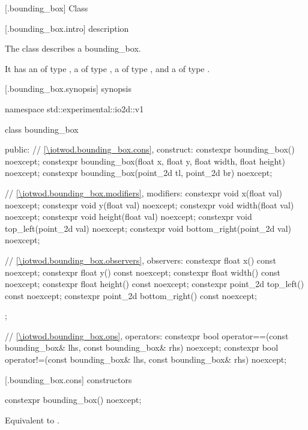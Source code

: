  [\iotwod.bounding_box] {Class }

 [\iotwod.bounding_box.intro] { description}

%
\pnum
The class  describes a bounding_box.

\pnum
It has an  of type , a  of type , a  of type , and a  of type .

 [\iotwod.bounding_box.synopsis] { synopsis}

\begin{codeblock}
namespace std::experimental::io2d::v1 {
  class bounding_box {
  public:
    // \ref{\iotwod.bounding_box.cons}, construct:
    constexpr bounding_box() noexcept;
    constexpr bounding_box(float x, float y, float width, float height)
      noexcept;
    constexpr bounding_box(point_2d tl, point_2d br) noexcept;

    // \ref{\iotwod.bounding_box.modifiers}, modifiers:
    constexpr void x(float val) noexcept;
    constexpr void y(float val) noexcept;
    constexpr void width(float val) noexcept;
    constexpr void height(float val) noexcept;
    constexpr void top_left(point_2d val) noexcept;
    constexpr void bottom_right(point_2d val) noexcept;
    
    // \ref{\iotwod.bounding_box.observers}, observers:
    constexpr float x() const noexcept;
    constexpr float y() const noexcept;
    constexpr float width() const noexcept;
    constexpr float height() const noexcept;
    constexpr point_2d top_left() const noexcept;
    constexpr point_2d bottom_right() const noexcept;
  };
  
  // \ref{\iotwod.bounding_box.ops}, operators:
  constexpr bool operator==(const bounding_box& lhs, const bounding_box& rhs) 
    noexcept;
  constexpr bool operator!=(const bounding_box& lhs, const bounding_box& rhs) 
    noexcept;
}
\end{codeblock}

 [\iotwod.bounding_box.cons] { constructors}

%
\begin{itemdecl}
constexpr bounding_box() noexcept;
\end{itemdecl}
\begin{itemdescr}
\pnum
\effects
Equivalent to .
\end{itemdescr}

